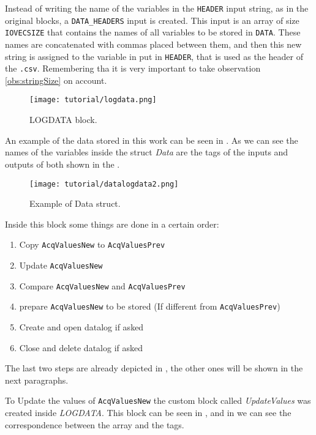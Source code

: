 Instead of writing the name of the variables in the \verb|HEADER| input string,
as in the original blocks, a \verb|DATA_HEADERS| input is created. This input is
an array of size \verb|IOVECSIZE| that contains the names of all variables to be
stored in \verb|DATA|. These names are concatenated with
commas placed between them, and then this new string is assigned to the variable
in put in \verb|HEADER|, that is used as the header of the \verb|.csv|.
Remembering tha it is
very important to take observation \ref{obs:stringSize} on account.

\begin{figure}[H] \centering
 \texttt{[image: tutorial/logdata.png]}
  \caption{LOGDATA block.}
  \label{fig:logdataBlock}
\end{figure}

An example of the data stored in this work can be seen in
. As we can see the names of the variables inside the
struct \emph{Data} are the tags of the inputs and outputs of both \PLCs{} shown
in the . 
\begin{figure}[H] \centering
 \texttt{[image: tutorial/datalogdata2.png]}
  \caption{Example of Data struct.}
  \label{fig:exampleDataStruct}
\end{figure}

Inside this block some things are done in a certain order:
\begin{enumerate}
\item Copy \verb|AcqValuesNew| to \verb|AcqValuesPrev|
\item Update \verb|AcqValuesNew|
\item Compare \verb|AcqValuesNew| and \verb|AcqValuesPrev| 
\item prepare \verb|AcqValuesNew| to be stored (If different from \verb|AcqValuesPrev|) 
\item Create and open datalog if asked
\item Close and delete datalog if asked
\end{enumerate}

The last two steps are already depicted in
, the other ones will be shown
in the next paragraphs.


To Update the values of \verb|AcqValuesNew| the custom block called
\emph{UpdateValues} was created inside \emph{LOGDATA}. This block can be seen in
, and in  we
can see the correspondence between the array and the tags.


